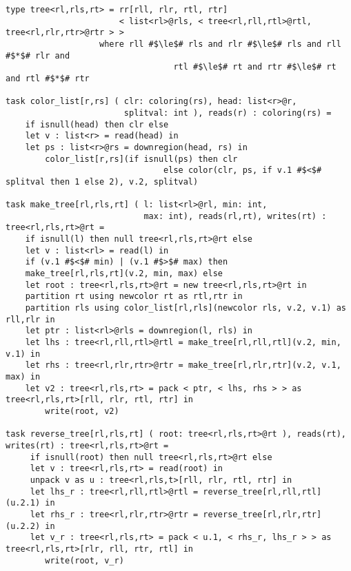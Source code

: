 \begin{lstlisting}[float={t},label={lst:treereverse},caption={Tree Partitioning and Reversal Example}]
type tree<rl,rls,rt> = rr[rll, rlr, rtl, rtr] 
                       < list<rl>@rls, < tree<rl,rll,rtl>@rtl, tree<rl,rlr,rtr>@rtr > >
     		       where rll #$\le$# rls and rlr #$\le$# rls and rll #$*$# rlr and 
                                  rtl #$\le$# rt and rtr #$\le$# rt  and rtl #$*$# rtr

task color_list[r,rs] ( clr: coloring(rs), head: list<r>@r, 
                        splitval: int ), reads(r) : coloring(rs) =
    if isnull(head) then clr else
    let v : list<r> = read(head) in
    let ps : list<r>@rs = downregion(head, rs) in
        color_list[r,rs](if isnull(ps) then clr 
                                else color(clr, ps, if v.1 #$<$# splitval then 1 else 2), v.2, splitval)

task make_tree[rl,rls,rt] ( l: list<rl>@rl, min: int, 
                            max: int), reads(rl,rt), writes(rt) : tree<rl,rls,rt>@rt =
    if isnull(l) then null tree<rl,rls,rt>@rt else 
    let v : list<rl> = read(l) in
    if (v.1 #$<$# min) | (v.1 #$>$# max) then
    make_tree[rl,rls,rt](v.2, min, max) else
    let root : tree<rl,rls,rt>@rt = new tree<rl,rls,rt>@rt in
    partition rt using newcolor rt as rtl,rtr in
    partition rls using color_list[rl,rls](newcolor rls, v.2, v.1) as rll,rlr in
    let ptr : list<rl>@rls = downregion(l, rls) in
    let lhs : tree<rl,rll,rtl>@rtl = make_tree[rl,rll,rtl](v.2, min, v.1) in
    let rhs : tree<rl,rlr,rtr>@rtr = make_tree[rl,rlr,rtr](v.2, v.1, max) in
    let v2 : tree<rl,rls,rt> = pack < ptr, < lhs, rhs > > as tree<rl,rls,rt>[rll, rlr, rtl, rtr] in
        write(root, v2)

task reverse_tree[rl,rls,rt] ( root: tree<rl,rls,rt>@rt ), reads(rt), writes(rt) : tree<rl,rls,rt>@rt =
     if isnull(root) then null tree<rl,rls,rt>@rt else
     let v : tree<rl,rls,rt> = read(root) in
     unpack v as u : tree<rl,rls,t>[rll, rlr, rtl, rtr] in
     let lhs_r : tree<rl,rll,rtl>@rtl = reverse_tree[rl,rll,rtl](u.2.1) in
     let rhs_r : tree<rl,rlr,rtr>@rtr = reverse_tree[rl,rlr,rtr](u.2.2) in
     let v_r : tree<rl,rls,rt> = pack < u.1, < rhs_r, lhs_r > > as tree<rl,rls,rt>[rlr, rll, rtr, rtl] in
        write(root, v_r)
\end{lstlisting}

